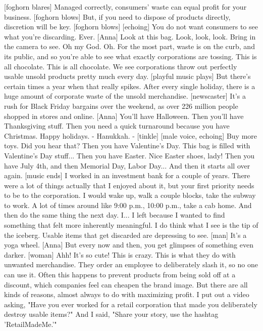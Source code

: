 \documentclass[a4paper]{article}
\begin{document}
	[foghorn blares]
	Managed correctly, consumers' waste can equal profit for your business.
	[foghorn blows]
	But, if you need to dispose of products directly,
	discretion will be key.
	[foghorn blows]
	[echoing] You do not want
	consumers to see what you're discarding.
	Ever.
	[Anna] Look at this bag.
	Look, look, look.
	Bring in the camera to see.
	Oh my God. Oh.
	For the most part, waste is on the curb, and its public,
	and so you're able to see
	what exactly corporations are tossing.
	This is all chocolate.
	This is all chocolate.
	We see corporations throw out perfectly usable unsold products
	pretty much every day.
	[playful music plays]
	But there's certain times a year when that really spikes.
	After every single holiday,
	there is a huge amount of corporate waste of the unsold merchandise.
	[newscaster] It's a rush for Black Friday bargains over the weekend,
	as over 226 million people shopped in stores and online.
	[Anna] You'll have Halloween.
	Then you'll have Thanksgiving stuff.
	Then you need a quick turnaround because you have Christmas.
	Happy holidays.
	- Hanukkah. - [tinkle]
	[male voice, echoing] Buy more toys.
	Did you hear that?
	Then you have Valentine's Day.
	This bag is filled with Valentine's Day stuff...
	Then you have Easter.
	Nice Easter shoes, lady!
	Then you have July 4th, and then Memorial Day, Labor Day...
	And then it starts all over again.
	[music ends]
	I worked in an investment bank for a couple of years.
	There were a lot of things actually that I enjoyed about it,
	but your first priority needs to be to the corporation.
	I would wake up, walk a couple blocks, take the subway to work.
	A lot of times around like 9:00 p.m., 10:00 p.m.,
	take a cab home.
	And then do the same thing the next day.
	I... I left because
	I wanted to find something that felt more inherently meaningful.
	I do think what I see is the tip of the iceberg.
	Usable items that get discarded are depressing to see.
	[man] It's a yoga wheel.
	[Anna] But every now and then, you get glimpses of something even darker.
	[woman] Ahh! It's so cute!
	This is crazy.
	This is what they do with unwanted merchandise.
	They order an employee to deliberately slash it,
	so no one can use it.
	Often this happens to prevent products from being sold off at a discount,
	which companies feel can cheapen the brand image.
	But there are all kinds of reasons,
	almost always to do with maximizing profit.
	I put out a video
	asking, "Have you ever worked for a retail corporation
	that made you deliberately destroy usable items?"
	And I said, "Share your story, use the hashtag 'RetailMadeMe.'"
\end{document}
